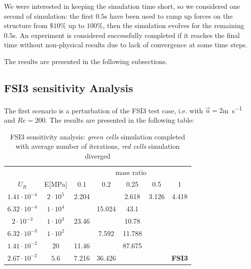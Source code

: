 We were interested in keeping the simulation time short, so we considered one second of simulation: the first $0.5$\si{s} have been used to ramp up forces on the structure from $\$10\%$ up to $100\%$, then the simulation evolves for the remaining $0.5$\si{s}. An experiment is considered successfully completed if it reaches the final time without non-physical results due to lack of convergence at some time steps.

The results are presented in the following subsections.


\subsection{FSI3 sensitivity Analysis}

The first scenario is a perturbation of the FSI3 test case, i.e. with $\vec{u}=2$\si{m.s^{-1}} and $Re=200$. The results are presented in the following table:

% 
\begin{table}[!htb]
	\begin{center}
		\begin{tabular}{ c | c | c c c c c |} 
			&  & \multicolumn{5}{c}{mass ratio} \\
			
			$U_R$ & E[\si{MPa}] & 0.1 & 0.2 & 0.25 & 0.5 & 1 \\
			\hline
			
			$1.41\cdot 10^{-4}$ & $2\cdot 10^{5}$ & \cellcolor{green!10}2.204 & \cellcolor{green!10} & \cellcolor{green!10}2.618 & \cellcolor{green!10}3.126 & \cellcolor{green!10}4.418 \\
			$6.32\cdot 10^{-4}$ & $1\cdot 10^{4}$ & \cellcolor{green!10} & \cellcolor{green!10}15.024 & \cellcolor{green!10}43.1 & \cellcolor{red!10} & \cellcolor{red!10} \\        
			$2\cdot 10^{-3}$ & $1\cdot 10^{3}$ & \cellcolor{green!10}23.46 & \cellcolor{green!10} & \cellcolor{green!10}10.78 & \cellcolor{red!10} & \cellcolor{red!10} \\
			$6.32\cdot 10^{-3}$ & $1\cdot 10^{2}$ & \cellcolor{green!10} & \cellcolor{green!10}7.592 & \cellcolor{green!10}11.788 & \cellcolor{red!10} & \cellcolor{red!10} \\
			$1.41\cdot 10^{-2}$ & $20$ & \cellcolor{green!10}11.46 & \cellcolor{green!10} & \cellcolor{green!10}87.675 & \cellcolor{red!10} & \cellcolor{red!10} \\
			$2.67\cdot 10^{-2}$ & $5.6$ & \cellcolor{green!10}7.216 & \cellcolor{green!10}36.426 & \cellcolor{red!10} & \cellcolor{red!10} & \cellcolor{red!10}\textbf{FSI3} \\
			\hline                        
		\end{tabular}
	\end{center}
	\caption{FSI3 sensitivity analysis: \textit{green cells} simulation completed with average number of iterations, \textit{red cells} simulation diverged}
	\label{table:FSI3-sens}
\end{table}


